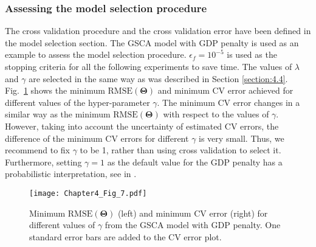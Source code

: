 \subsubsection{Assessing the model selection procedure}
The cross validation procedure and the cross validation error have been defined in the model selection section. The GSCA model with GDP penalty is used as an example to assess the model selection procedure. $\epsilon_f=10^{-5}$ is used as the stopping criteria for all the following experiments to save time. The values of $\lambda$ and $\gamma$ are selected in the same way as was described in Section \ref{section:4.4}. Fig.~\ref{chapter4_fig:7} shows the minimum $\text{RMSE}(\mathbf{\Theta})$ and minimum CV error achieved for different values of the hyper-parameter $\gamma$. The minimum CV error changes in a similar way as the minimum $\text{RMSE}(\mathbf{\Theta})$ with respect to the values of $\gamma$. However, taking into account the uncertainty of estimated CV errors, the difference of the minimum CV errors for different $\gamma$ is very small. Thus, we recommend to fix $\gamma$ to be 1, rather than using cross validation to select it. Furthermore, setting $\gamma = 1$ as the default value for the GDP penalty has a probabilistic interpretation, see in \cite{armagan2013generalized}.
\begin{figure}[htbp]
    \centering
    \texttt{[image: Chapter4\_Fig\_7.pdf]}
    \caption{Minimum $\text{RMSE}(\mathbf{\Theta})$ (left) and minimum CV error (right) for different values of $\gamma$ from the GSCA model with GDP penalty. One standard error bars are added to the CV error plot.}
\label{chapter4_fig:7}
\end{figure}

